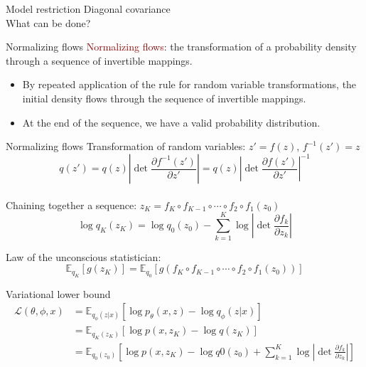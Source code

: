 \documentclass[unicode,11pt]{beamer}
\begin{document}
\begin{frame}[fragile]{Model restriction}
Diagonal covariance\\
\vspace{5mm}
What can be done?
\end{frame}


\begin{frame}[fragile]{Normalizing flows}
\textcolor{darkred}{Normalizing flows}: the transformation of a probability density through
a sequence of invertible mappings.
\begin{itemize}
  \item By repeated application of the rule for random variable transformations, the initial
density flows through the sequence of invertible mappings.
  \item At the end of the sequence, we have a valid probability distribution.
\end{itemize}

\end{frame}

\begin{frame}[fragile]{Normalizing flows}
Transformation of random variables: $z' = f(z)$, $f^{-1}(z') = z$\\
$$q(z') = q(z) \left\vert \det \frac{\partial f^{-1}(z')}{\partial z'} \right\vert = 
q(z) \left\vert \det \frac{\partial f(z')}{\partial z'} \right\vert^{-1}$$\\
Chaining together a sequence: $z_K = f_K \circ f_{K−1} \circ \cdots \circ f_2 \circ f_1(z_0)$\\
$$\log q_K(z_K) = \log q_0(z_0) − \sum_{k=1}^K \log \left\vert \det \frac{\partial f_k}{\partial z_k} \right\vert $$

Law of the unconscious statistician:\\
$$\mathbb{E}_{q_K} \left[g(z_K)\right] = \mathbb{E}_{q_0} \left[ g(f_K \circ f_{K−1} \circ \cdots \circ f_2 \circ f_1(z_0)) \right] $$
\end{frame}

\begin{frame}[fragile]{Variational lower bound}
\begin{align*} 
\mathcal{L}(\theta, \phi, x) &= \mathbb{E}_{q_\phi(z|x)} \left[ \log p_\theta(x, z) - \log q_\phi(z | x) \right] \\
&= \mathbb{E}_{q_K(z_K)} \left[ \log p(x, z_K) - \log q(z_K) \right] \\
&= \mathbb{E}_{q_0(z_0)} \left[ \log p(x, z_K) - \log q0(z_0) + \sum_{k=1}^K \log \left\vert \det \frac{\partial f_k}{\partial z_k} \right\vert \right] 
\end{align*} 
\end{frame}
\end{document}
